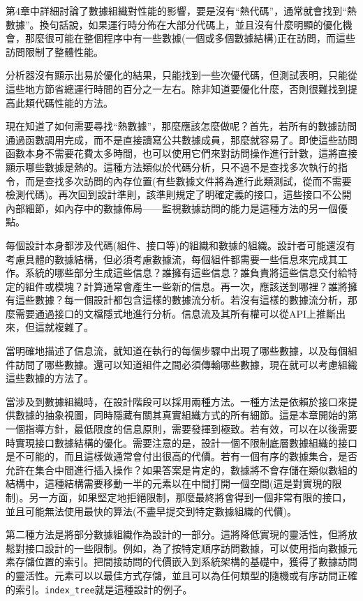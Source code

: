 第4章中詳細討論了數據組織對性能的影響，要是沒有“熱代碼”，通常就會找到“熱數據”。換句話說，如果運行時分佈在大部分代碼上，並且沒有什麼明顯的優化機會，那麼很可能在整個程序中有一些數據(一個或多個數據結構)正在訪問，而這些訪問限制了整體性能。

分析器沒有顯示出易於優化的結果，只能找到一些次優代碼，但測試表明，只能從這些地方節省總運行時間的百分之一左右。除非知道要優化什麼，否則很難找到提高此類代碼性能的方法。 

現在知道了如何需要尋找“熱數據”，那麼應該怎麼做呢？首先，若所有的數據訪問通過函數調用完成，而不是直接讀寫公共數據成員，那麼就容易了。即使這些訪問函數本身不需要花費太多時間，也可以使用它們來對訪問操作進行計數，這將直接顯示哪些數據是熱的。這種方法類似於代碼分析，只不過不是查找多次執行的指令，而是查找多次訪問的內存位置(有些數據文件將為進行此類測試，從而不需要檢測代碼)。再次回到設計準則，該準則規定了明確定義的接口，這些接口不公開內部細節，如內存中的數據佈局——監視數據訪問的能力是這種方法的另一個優點。

每個設計本身都涉及代碼(組件、接口等)的組織和數據的組織。設計者可能還沒有考慮具體的數據結構，但必須考慮數據流，每個組件都需要一些信息來完成其工作。系統的哪些部分生成這些信息？誰擁有這些信息？誰負責將這些信息交付給特定的組件或模塊？計算通常會產生一些新的信息。再一次，應該送到哪裡？誰將擁有這些數據？每一個設計都包含這樣的數據流分析。若沒有這樣的數據流分析，那麼需要通過接口的文檔隱式地進行分析。信息流及其所有權可以從API上推斷出來，但這就複雜了。 

當明確地描述了信息流，就知道在執行的每個步驟中出現了哪些數據，以及每個組件訪問了哪些數據。還可以知道組件之間必須傳輸哪些數據，現在就可以考慮組織這些數據的方法了。

當涉及到數據組織時，在設計階段可以採用兩種方法。一種方法是依賴於接口來提供數據的抽象視圖，同時隱藏有關其真實組織方式的所有細節。這是本章開始的第一個指導方針，最低限度的信息原則，需要發揮到極致。若有效，可以在以後需要時實現接口數據結構的優化。需要注意的是，設計一個不限制底層數據組織的接口是不可能的，而且這樣做通常會付出很高的代價。若有一個有序的數據集合，是否允許在集合中間進行插入操作？如果答案是肯定的，數據將不會存儲在類似數組的結構中，這種結構需要移動一半的元素以在中間打開一個空間(這是對實現的限制)。另一方面，如果堅定地拒絕限制，那麼最終將會得到一個非常有限的接口，並且可能無法使用最快的算法(不盡早提交到特定數據組織的代價)。

第二種方法是將部分數據組織作為設計的一部分。這將降低實現的靈活性，但將放鬆對接口設計的一些限制。例如，為了按特定順序訪問數據，可以使用指向數據元素存儲位置的索引。把間接訪問的代價嵌入到系統架構的基礎中，獲得了數據訪問的靈活性。元素可以以最佳方式存儲，並且可以為任何類型的隨機或有序訪問正確的索引。\texttt{index\_tree}就是這種設計的例子。 

